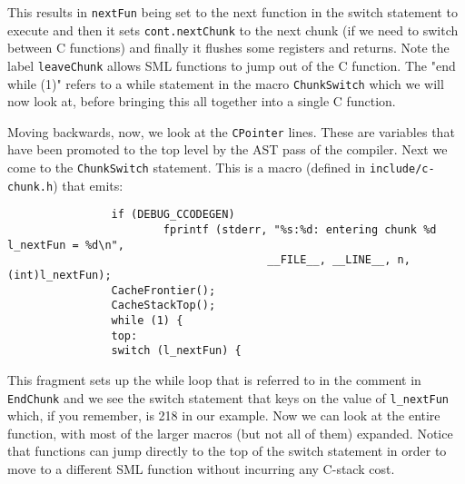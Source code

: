 This results in \texttt{nextFun} being set to the next function in the switch statement to execute and then it sets \texttt{cont.nextChunk} to the next chunk (if we need to switch between C functions) and finally it flushes some registers and returns. Note the label \texttt{leaveChunk} allows SML functions to jump out of the C function. The "end while (1)" refers to a while statement in the macro \texttt{ChunkSwitch} which we will now look at, before bringing this all together into a single C function.

Moving backwards, now, we look at the \texttt{CPointer} lines. These are variables that have been promoted to the top level by the AST pass of the compiler. Next we come to the \texttt{ChunkSwitch} statement. This is a macro (defined in \texttt{include/c-chunk.h}) that emits:

\begin{minipage}{\linewidth}
\lstset{language=C}\begin{lstlisting}
                if (DEBUG_CCODEGEN)
                        fprintf (stderr, "%s:%d: entering chunk %d  l_nextFun = %d\n",
                                        __FILE__, __LINE__, n, (int)l_nextFun);
                CacheFrontier();
                CacheStackTop();
                while (1) {
                top:
                switch (l_nextFun) {
\end{lstlisting}
\end{minipage}

This fragment sets up the while loop that is referred to in the comment in \texttt{EndChunk} and we see the switch statement that keys on the value of \texttt{l\_nextFun} which, if you remember, is 218 in our example. Now we can look at the entire function, with most of the larger macros (but not all of them) expanded. Notice that functions can jump directly to the top of the switch statement in order to move to a different SML function without incurring any C-stack cost.


